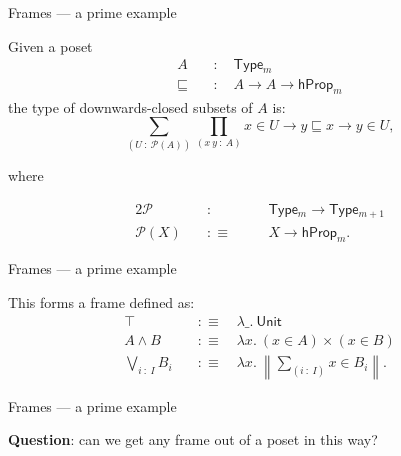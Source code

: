 \documentclass[xcolor={dvipsnames}]{beamer}
\newcommand{\pity}[3]{\prod_{(#1~:~#2)} #3}
\newcommand{\sigmaty}[3]{\sum_{(#1~:~#2)} #3}
\newcommand{\pow}[1]{\mathcal{P}\left(#1\right)}
\newcommand{\univ}{\mathsf{Type}}
\newcommand{\trunc}[1]{\left\| #1 \right\|}
\newcommand{\is}{:\equiv}
\begin{document}
\begin{frame}{Frames --- a prime example}
  \large

  Given a poset
  \begin{align*}
    A &\quad:\quad \univ{}_m\\
    \sqsubseteq &\quad:\quad A \rightarrow A \rightarrow \mathsf{hProp}_m
  \end{align*}
  the type of \alert{downwards-closed subsets} of $A$ is:
  \[ \sigmaty{U}{\pow{A}}{\pity{x~y}{A}{x \in U \rightarrow y \sqsubseteq x \rightarrow y \in U}}, \]
  \begin{center}
    where
  \end{center}
  \begin{alignat*}{2}
    \mathcal{P}    \quad&:\quad   && \univ{}_m \rightarrow \univ{}_{m+1} \\
    \mathcal{P}(X) \quad&\is\quad && X \rightarrow \mathsf{hProp}_m     . 
  \end{alignat*}
\end{frame}

\begin{frame}{Frames --- a prime example}
  \large

  This forms a \alert{frame} defined as:
  \begin{align*}
    \top           &\quad\is{}\quad \lambda \_.~ \mathsf{Unit}\\
    A \wedge B       &\quad\is{}\quad \lambda x.~ (x \in A) \times (x \in B)\\
    \bigvee_{i~:~I} B_i &\quad\is{}\quad \lambda x.~ \trunc{\sigmaty{i}{I}{x \in B_i}}.
  \end{align*}
\end{frame}

\begin{frame}{Frames --- a prime example}
  \large

  \textbf{Question}: can we get any frame out of a poset in this way?

  \vspace{1em}

\end{frame}
\end{document}
